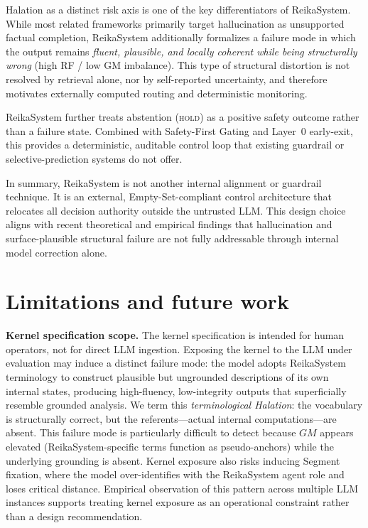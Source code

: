 \documentclass[11pt,a4paper]{article}
\begin{document}
Halation as a distinct risk axis is one of the key differentiators of ReikaSystem.
While most related frameworks primarily target hallucination as unsupported factual
completion, ReikaSystem additionally formalizes a failure mode in which the output
remains \emph{fluent, plausible, and locally coherent while being structurally wrong}
(high RF / low GM imbalance). This type of structural distortion is not resolved by
retrieval alone, nor by self-reported uncertainty, and therefore motivates externally
computed routing and deterministic monitoring.

ReikaSystem further treats abstention (\textsc{hold}) as a positive safety outcome
rather than a failure state. Combined with Safety-First Gating and Layer~0 early-exit,
this provides a deterministic, auditable control loop that existing guardrail or
selective-prediction systems do not offer.

In summary, ReikaSystem is not another internal alignment or guardrail technique.
It is an external, Empty-Set-compliant control architecture that relocates all decision
authority outside the untrusted LLM. This design choice aligns with recent theoretical
and empirical findings that hallucination and surface-plausible structural failure are
not fully addressable through internal model correction alone.

\section{Limitations and future work}
\label{sec:limitations}

\textbf{Kernel specification scope.}
The kernel specification is intended for human operators, not for direct LLM ingestion.
Exposing the kernel to the LLM under evaluation may induce a distinct failure mode:
the model adopts ReikaSystem terminology to construct plausible but ungrounded
descriptions of its own internal states, producing high-fluency, low-integrity outputs
that superficially resemble grounded analysis.
We term this \textit{terminological Halation}: the vocabulary is structurally correct,
but the referents---actual internal computations---are absent.
This failure mode is particularly difficult to detect because $GM$ appears elevated
(ReikaSystem-specific terms function as pseudo-anchors) while the underlying
grounding is absent. Kernel exposure also risks inducing Segment fixation,
where the model over-identifies with the ReikaSystem agent role and loses
critical distance. Empirical observation of this pattern across multiple LLM
instances supports treating kernel exposure as an operational constraint rather
than a design recommendation.
\end{document}
